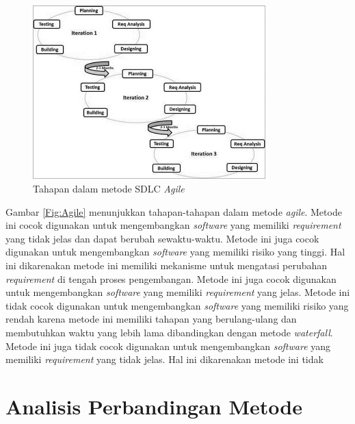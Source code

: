 \begin{figure}[h]
	\centering
	\includegraphics[width=9cm]{contents/chapter-2/sdlc_agile_model.jpg}
	\caption{Tahapan dalam metode SDLC \textit{Agile}\cite{noauthor_sdlc_nodate}}
	\label{Fig:Agile_step}
\end{figure}

Gambar \ref{Fig:Agile} menunjukkan tahapan-tahapan dalam metode \textit{agile}. 
Metode ini cocok digunakan untuk mengembangkan \textit{software} yang memiliki 
\textit{requirement} yang tidak jelas dan dapat berubah sewaktu-waktu. Metode ini 
juga cocok digunakan untuk mengembangkan \textit{software} yang memiliki risiko yang 
tinggi. Hal ini dikarenakan metode ini memiliki mekanisme untuk mengatasi perubahan 
\textit{requirement} di tengah proses pengembangan. Metode ini juga cocok digunakan 
untuk mengembangkan \textit{software} yang memiliki \textit{requirement} yang jelas. 
Metode ini tidak cocok digunakan untuk mengembangkan \textit{software} yang memiliki 
risiko yang rendah karena metode ini memiliki tahapan yang berulang-ulang dan 
membutuhkan waktu yang lebih lama dibandingkan dengan metode \textit{waterfall}. 
Metode ini juga tidak cocok digunakan untuk mengembangkan \textit{software} yang 
memiliki \textit{requirement} yang tidak jelas. Hal ini dikarenakan metode ini tidak 


\section{Analisis Perbandingan Metode}


